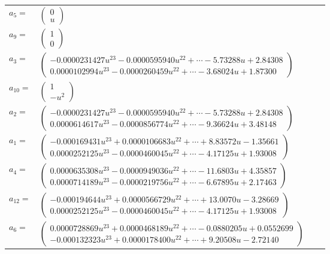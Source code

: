 \documentclass[1p]{elsarticle_modified}
\theoremstyle{definition}
\begin{document}
\begin{tabular}{m{7pt} m{180pt} m{7pt} m{180pt} }
\flushright $a_{5}=$&$\begin{pmatrix}0\\u\end{pmatrix}$ \\
\flushright $a_{9}=$&$\begin{pmatrix}1\\0\end{pmatrix}$ \\
\flushright $a_{3}=$&$\begin{pmatrix}-0.0000231427 u^{23}-0.0000595940 u^{22}+\cdots-5.73288 u+2.84308\\0.0000102994 u^{23}-0.0000260459 u^{22}+\cdots-3.68024 u+1.87300\end{pmatrix}$ \\
\flushright $a_{10}=$&$\begin{pmatrix}1\\- u^2\end{pmatrix}$ \\
\flushright $a_{2}=$&$\begin{pmatrix}-0.0000231427 u^{23}-0.0000595940 u^{22}+\cdots-5.73288 u+2.84308\\0.0000614617 u^{23}-0.0000856774 u^{22}+\cdots-9.36624 u+3.48148\end{pmatrix}$ \\
\flushright $a_{1}=$&$\begin{pmatrix}-0.000169431 u^{23}+0.0000106683 u^{22}+\cdots+8.83572 u-1.35661\\0.0000252125 u^{23}-0.0000460045 u^{22}+\cdots-4.17125 u+1.93008\end{pmatrix}$ \\
\flushright $a_{4}=$&$\begin{pmatrix}0.0000635308 u^{23}-0.0000949036 u^{22}+\cdots-11.6803 u+4.35857\\0.0000714189 u^{23}-0.0000219756 u^{22}+\cdots-6.67895 u+2.17463\end{pmatrix}$ \\
\flushright $a_{12}=$&$\begin{pmatrix}-0.000194644 u^{23}+0.0000566729 u^{22}+\cdots+13.0070 u-3.28669\\0.0000252125 u^{23}-0.0000460045 u^{22}+\cdots-4.17125 u+1.93008\end{pmatrix}$ \\
\flushright $a_{6}=$&$\begin{pmatrix}0.0000728869 u^{23}+0.0000468189 u^{22}+\cdots-0.0880205 u+0.0552699\\-0.000132323 u^{23}+0.0000178400 u^{22}+\cdots+9.20508 u-2.72140\end{pmatrix}$ \\

\end{tabular}
\end{document}
